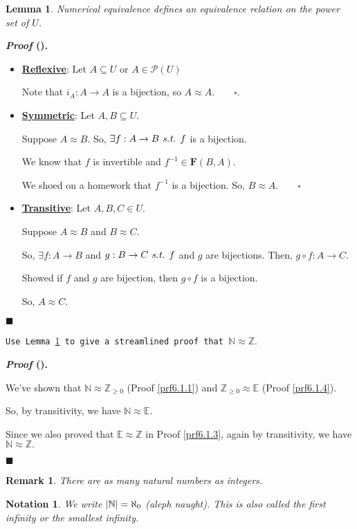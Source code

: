 \documentclass[12pt,a4paper]{article}
\newtheorem{nota}{Notation}[section]
\newtheorem{lem}{Lemma}[section]
\newcounter{nprf}[subsection]
\newtheorem*{rmk}{\indent Remark}
\newenvironment*{prf}{\par\indent\textbf{\textit{Proof} (\stepcounter{nprf}\thenprf). }\par }{\par\hfill $\blacksquare$\par}
\def\Z{{\mathbb{Z}}}
\def\N{{\mathbb{N}}}
\def\E{{\mathbb{E}}}
\def\pow{{\mathcal{P}}}
\def\f{f^{-1}}
\def\of{\circ}
\def\F{\mathbf{F}}
\def\st{\emph{ s.t. }}
\begin{document}
\begin{framed}
\begin{lem}\label{lem6.1}
	Numerical equivalence defines an \textit{equivalence relation} on the power set of $U$. 	
\end{lem}
\begin{prf}
	\begin{itemize}
		\item \textbf{\underline{Reflexive}}: Let $A\subseteq U$ or $A\in\pow(U)$\par Note that $i_A:A\to A$ is a bijection, so $A\approx A.\qquad\square.$
		\item \textbf{\underline{Symmetric}}: Let $A,B\subseteq U.$\par Suppose $A\approx B.$ So, $\exists f:A\to B\st f$ is a bijection.\par We know that $f$ is invertible and $\f\in\F(B,A).$\par We shoed on a homework that $\f$ is a bijection. So, $B\approx A.\qquad\square$
		\item \textbf{\underline{Transitive}}: Let $A,B,C\in U.$\par Suppose $A\approx B$ and $B\approx C.$\par So, $\exists f:A\to B$ and $g:B\to C\st f$ and $g$ are bijections. Then, $g\of f:A\to C.$\par Showed if $f$ and $g$ are bijection, then $g\of f$ is a bijection.\par So, $A\approx C.$
	\end{itemize}
\end{prf}
\end{framed}
\begin{framed}
\noindent\texttt{Use Lemma \ref{lem6.1} to give a streamlined proof that $\N\approx\Z.$}	
\begin{prf}
	We've shown that $\N\approx\Z_{\geq0}$ (Proof \ref{prf6.1.1}) and $\Z_{\geq0}\approx\E$ (Proof \ref{prf6.1.4}).\par So, by transitivity, we have $\N\approx\E.$\par Since we also proved that $\E\approx\Z$ in Proof \ref{prf6.1.3}, again by transitivity, we have $\N\approx\Z.$	
\end{prf}
\begin{rmk} There are as many natural numbers as integers. \end{rmk}
\end{framed}
\begin{nota}
	We write $\qty|\N|=\aleph_0$ (aleph naught). This is also called the first infinity or the smallest infinity.	
\end{nota}
\end{document}
